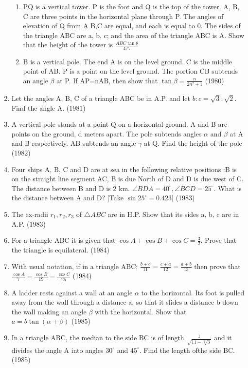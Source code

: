 \documentclass[12pt]{article}
\begin{document}
\begin{enumerate}
\begin{enumerate}
\item PQ is a vertical tower. P is the foot and Q is the top of the tower. A, B, C are three points in the horizontal plane through P. The angles of elevation of Q from A
B,C are equal, and each is equal to 0. The sides of the triangle ABC are a, b, c; and the area of the triangle ABC is A. Show that the height of the tower is $\frac{ABC\tan \theta}{4\triangle}$
\item B is a vertical pole. The end A is on the level ground. C is the middle point of AB. P is a point on the level ground. The portion CB subtends an angle $\beta$ at P. If AP=nAB, then show that $\tan\beta=\frac{n}{2n^2+1}$ (1980)
\end{enumerate}
\item Let the angles A, B, C of a triangle ABC be in A.P. and let $b:c=\sqrt{3}:\sqrt{2}$. Find the angle A. (1981)
\item A vertical pole stands at a point Q on a horizontal ground. A and B are points on the ground, d meters apart. The pole subtends angles $\alpha$ and $\beta$ at A and B respectively. AB subtends an angle $\gamma$ at Q. Find the height of the pole (1982)
\item Four ships A, B, C and D are at sea in the following relative positions :B is on the straight line segment AC, B is due North of D and D is due west of C. The distance between B and D is 2 km. $\angle BDA=40^\circ,\angle BCD=25^\circ$. What is the distance between A and D? [Take $\sin 25^\circ=0.423$] (1983)
\item The ex-radii $r_1,r_2,r_3$ of $\triangle ABC$ are in H.P. Show that its sides a, b, c are in A.P. (1983)
\item For a triangle ABC it is given that $\cos A+\cos B+\cos C=\frac{3}{2}$. Prove that the triangle is equilateral. (1984)
\item With usual notation, if in a triangle ABC; $\frac{b+c}{11}=\frac{c+a}{12}=\frac{a+b}{13}$ then prove that $\frac{\cos A}{7}=\frac{\cos B}{19}=\frac{\cos C}{25}$ (1984)
\item A ladder rests against a wall at an angle $\alpha$ to the horizontal. Its foot is pulled away from the wall through a distance a, so that it slides a distance b down the wall making an angle $\beta$ with the horizontal. Show that $a=b\tan(\alpha+\beta)$ (1985)
\item In a triangle ABC, the median to the side BC is of length $\frac{1}{\sqrt{11-\sqrt[6]{3}}}$ and it divides the angle A into angles $30^\circ$ and $45^\circ$. Find the length ofthe side BC. (1985)

\end{enumerate}
\end{document}
